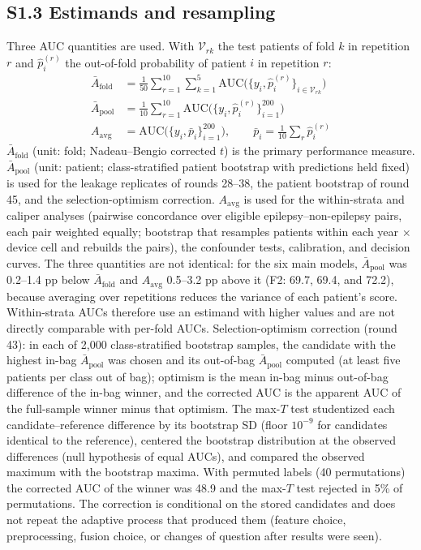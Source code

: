 \subsection*{S1.3 Estimands and resampling}
Three AUC quantities are used. With $\mathcal{V}_{rk}$ the test patients of fold $k$ in repetition $r$ and $\hat p_i^{(r)}$ the out-of-fold probability of patient $i$ in repetition $r$:
\begin{align}
\bar A_{\mathrm{fold}} &= \tfrac{1}{50}\textstyle\sum_{r=1}^{10}\sum_{k=1}^{5}\mathrm{AUC}\big(\{y_i,\hat p_i^{(r)}\}_{i\in\mathcal{V}_{rk}}\big)\label{eq:s1_fold}\\
\bar A_{\mathrm{pool}} &= \tfrac{1}{10}\textstyle\sum_{r=1}^{10}\mathrm{AUC}\big(\{y_i,\hat p_i^{(r)}\}_{i=1}^{200}\big)\label{eq:s1_pool}\\
A_{\mathrm{avg}} &= \mathrm{AUC}\big(\{y_i,\bar p_i\}_{i=1}^{200}\big),\qquad \bar p_i=\tfrac{1}{10}\textstyle\sum_{r}\hat p_i^{(r)}\label{eq:s1_avg}
\end{align}
$\bar A_{\mathrm{fold}}$ (unit: fold; Nadeau--Bengio corrected $t$) is the primary performance measure. $\bar A_{\mathrm{pool}}$ (unit: patient; class-stratified patient bootstrap with predictions held fixed) is used for the leakage replicates of rounds 28--38, the patient bootstrap of round 45, and the selection-optimism correction. $A_{\mathrm{avg}}$ is used for the within-strata and caliper analyses (pairwise concordance over eligible epilepsy--non-epilepsy pairs, each pair weighted equally; bootstrap that resamples patients within each year $\times$ device cell and rebuilds the pairs), the confounder tests, calibration, and decision curves. The three quantities are not identical: for the six main models, $\bar A_{\mathrm{pool}}$ was 0.2--1.4 pp below $\bar A_{\mathrm{fold}}$ and $A_{\mathrm{avg}}$ 0.5--3.2 pp above it (F2: 69.7, 69.4, and 72.2), because averaging over repetitions reduces the variance of each patient's score. Within-strata AUCs therefore use an estimand with higher values and are not directly comparable with per-fold AUCs.
Selection-optimism correction (round 43): in each of 2,000 class-stratified bootstrap samples, the candidate with the highest in-bag $\bar A_{\mathrm{pool}}$ was chosen and its out-of-bag $\bar A_{\mathrm{pool}}$ computed (at least five patients per class out of bag); optimism is the mean in-bag minus out-of-bag difference of the in-bag winner, and the corrected AUC is the apparent AUC of the full-sample winner minus that optimism. The max-$T$ test studentized each candidate--reference difference by its bootstrap SD (floor $10^{-9}$ for candidates identical to the reference), centered the bootstrap distribution at the observed differences (null hypothesis of equal AUCs), and compared the observed maximum with the bootstrap maxima. With permuted labels (40 permutations) the corrected AUC of the winner was 48.9 and the max-$T$ test rejected in 5\% of permutations. The correction is conditional on the stored candidates and does not repeat the adaptive process that produced them (feature choice, preprocessing, fusion choice, or changes of question after results were seen).

